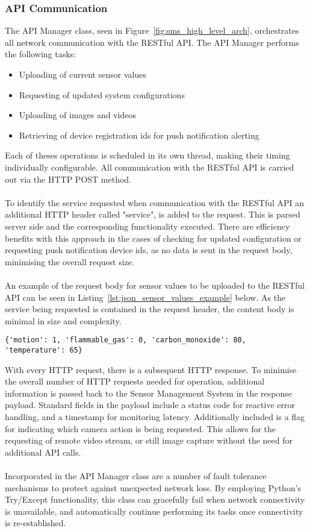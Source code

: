 \documentclass{article}
\begin{document}
\subsubsection{API Communication}
\label{sssec:sms_api_comm}
The API Manager class, seen in Figure~\ref{fig:sms_high_level_arch}, orchestrates all network communication with the RESTful API.
The API Manager performs the following tasks:
\begin{itemize}
  \item Uploading of current sensor values
  \item Requesting of updated system configurations
  \item Uploading of images and videos
  \item Retrieving of device registration ids for push notification alerting
\end{itemize}
Each of theses operations is scheduled in its own thread, making their timing individually configurable.  All communication with the RESTful API is carried out via the HTTP POST method.\\\\
To identify the service requested when communication with the RESTful API an additional HTTP header called "service", is added to the request. This is parsed server side and the corresponding functionality executed. There are efficiency benefits with this approach in the cases of checking for updated configuration or requesting push notification device ids, as no data is sent in the request body, minimising the overall request size. \\\\
An example of the request body for sensor values to be uploaded to the RESTful API can be seen in Listing~\ref{lst:json_sensor_values_example} below. As the service being requested is contained in the request header, the content body is minimal in size and complexity.
\begin{center}
\begin{lstlisting}[caption={Sensor Values Request Body Example},label={lst:json_sensor_values_example}]
{'motion': 1, 'flammable_gas': 0, 'carbon_monoxide': 80, 'temperature': 65}
\end{lstlisting}
\end{center}
With every HTTP request, there is a subsequent HTTP response. To minimise the overall number of HTTP requests needed for operation, additional information is passed back to the Sensor Management System in the response payload. Standard fields in the payload include a status code for reactive error handling, and a timestamp for monitoring latency. Additionally included is a flag for indicating which camera action is being requested. This allows for the requesting of remote video stream, or still image capture without the need for additional API calls. \\\\
Incorporated in the API Manager class are a number of fault tolerance mechanisms to protect against unexpected network loss. By employing Python\rq s Try/Except functionality, this class can gracefully fail when network connectivity is unavailable, and automatically continue performing its tasks once connectivity is re-established.
\end{document}
